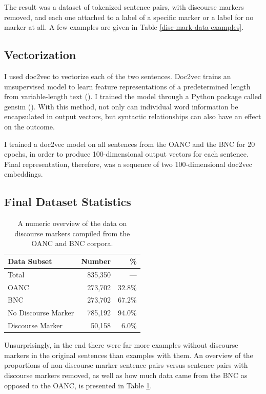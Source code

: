 The result was a dataset of tokenized sentence pairs, with discourse markers removed, and each one attached to a label of a specific marker or a label for no marker at all. A few examples are given in Table \ref{disc-mark-data-examples}.

\subsection{Vectorization}

I used doc2vec to vectorize each of the two sentences. Doc2vec trains an unsupervised model to learn feature representations of a predetermined length from variable-length text (\cite{le2014doc2vec}). I trained the model through a Python package called gensim (\cite{rehurek2010gensim}). With this method, not only can individual word information be encapsulated in output vectors, but syntactic relationships can also have an effect on the outcome.

I trained a doc2vec model on all sentences from the OANC and the BNC for 20 epochs, in order to produce 100-dimensional output vectors for each sentence. Final representation, therefore, was a sequence of two 100-dimensional doc2vec embeddings.

\subsection{Final Dataset Statistics}

\begin{table}[h]
\centering
 \begin{tabular}{|| l | r | r ||}
 \hline
 Data Subset & Number & \% \\ [0.3ex] 
 \hline\hline
 Total & 835,350 & --- \\
 \hline
 OANC & 273,702 & $32.8\%$ \\
 \hline
 BNC & 273,702 & $67.2\%$ \\
 \hline
 No Discourse Marker & 785,192 & $94.0\%$ \\
 \hline
 Discourse Marker & 50,158 & $6.0\%$ \\
 \hline
\end{tabular}
\caption{A numeric overview of the data on discourse markers compiled from the OANC and BNC corpora.}
\label{disc-mark-gen-data-stats}
\end{table}

Unsurprisingly, in the end there were far more examples without discourse markers in the original sentences than examples with them. An overview of the proportions of non-discourse marker sentence pairs versus sentence pairs with discourse markers removed, as well as how much data came from the BNC as opposed to the OANC, is presented in Table \ref{disc-mark-gen-data-stats}.

